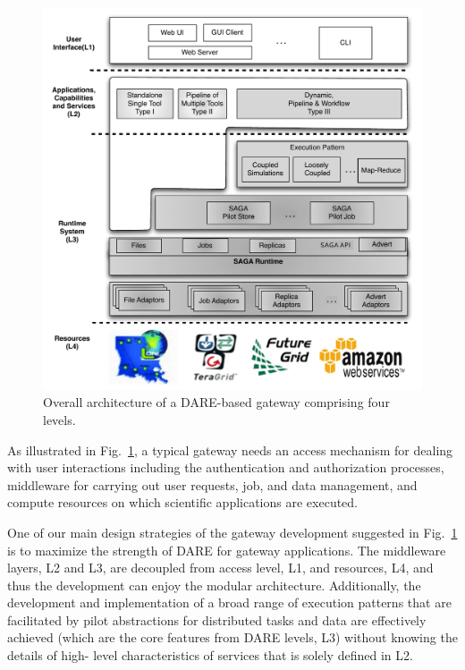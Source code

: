 \documentclass[]{svjour3}
\begin{document}

\begin{figure}
  \centering
  \includegraphics[scale=0.55]{figures/DARE-gateway-arch.pdf}
  \caption{\small {} Overall architecture of a DARE-based gateway comprising four levels. %
  }
  \label{fig:dare-arch} 
\end{figure}


As illustrated in Fig.~\ref{fig:dare-arch}, a typical gateway needs an access mechanism for dealing with user 
interactions including the authentication and authorization processes, middleware for carrying out user requests, job, 
and data management, and compute resources on which scientific applications are executed. 

 One of
our main design strategies of the gateway development suggested in
Fig.~\ref{fig:dare-arch} is to maximize the strength of DARE for
gateway applications.  The middleware layers, L2 and L3, are decoupled
from access level, L1, and resources, L4, and thus the development can
enjoy the modular architecture. Additionally, the development and
implementation of a broad range of execution patterns that are
facilitated by pilot abstractions for distributed tasks and data are
effectively achieved (which are the core features from DARE levels,
L3) without knowing the details of high- level characteristics of
services that is solely defined in L2.
\end{document}
